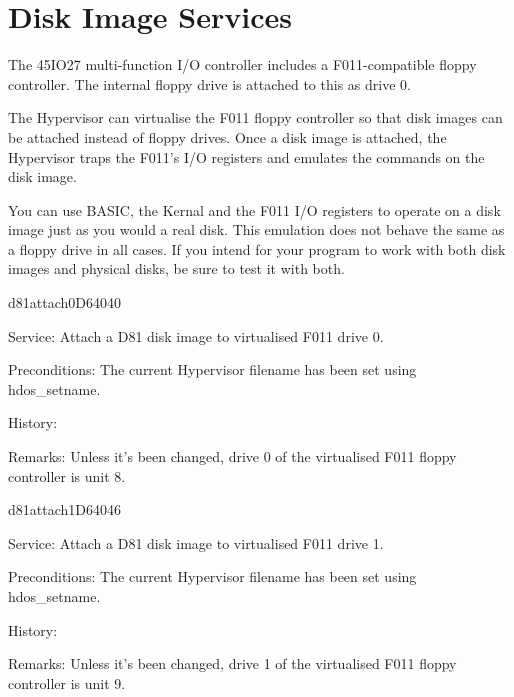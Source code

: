 \newpage
\section{Disk Image Services}

The 45IO27 multi-function I/O controller includes a F011-compatible floppy
controller. The internal floppy drive is attached to this as drive 0.

The Hypervisor can virtualise the F011 floppy controller so that disk images
can be attached instead of floppy drives. Once a disk image is attached, the
Hypervisor traps the F011's I/O registers and emulates the commands on the disk
image.

You can use BASIC, the Kernal and the F011 I/O registers to operate on a disk
image just as you would a real disk. This emulation does not behave the same as
a floppy drive in all cases. If you intend for your program to work with both
disk images and physical disks, be sure to test it with both.


\begin{hyppotrap}{d81attach0}{D640}{40}
\item [Service:]
  Attach a D81 disk image to virtualised F011 drive 0.
\item [Preconditions:]
  The current Hypervisor filename has been set using hdos\_setname.
\item [History:]
\item [Remarks:]
  Unless it's been changed, drive 0 of the virtualised F011 floppy controller is
  unit 8.
\end{hyppotrap}


\newpage
\begin{hyppotrap}{d81attach1}{D640}{46}
\item [Service:]
  Attach a D81 disk image to virtualised F011 drive 1.
\item [Preconditions:]
  The current Hypervisor filename has been set using hdos\_setname.
\item [History:]
\item [Remarks:]
  Unless it's been changed, drive 1 of the virtualised F011 floppy controller is
  unit 9.
\end{hyppotrap}



